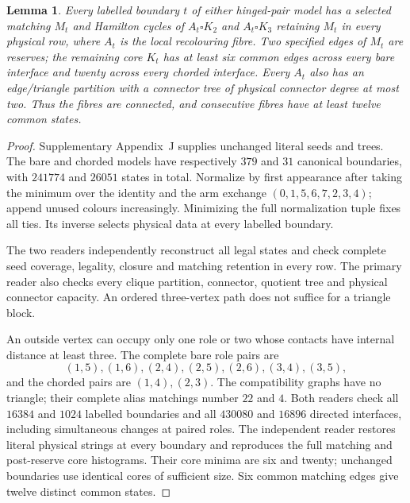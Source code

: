 \documentclass[11pt]{article}
\newtheorem{lemma}[theorem]{Lemma}
\theoremstyle{remark}
\numberwithin{equation}{section}
\numberwithin{table}{section}
\begin{document}
\begin{lemma}\label{lem:hinged-data}
Every labelled boundary $t$ of either hinged-pair model has a selected
matching $M_t$ and Hamilton cycles of $A_t\square K_2$ and
$A_t\square K_3$ retaining $M_t$ in every physical row, where $A_t$
is the local recolouring fibre. Two specified edges of $M_t$ are
reserves; the remaining core $K_t$ has at least six common edges
across every bare interface and twenty across every chorded interface.
Every $A_t$ also has an edge/triangle partition with a connector tree
of physical connector degree at most two. Thus the fibres are connected,
and consecutive fibres have at least twelve common states.
\end{lemma}
\begin{proof}
Supplementary Appendix~J supplies unchanged literal seeds and trees.
The bare and chorded models have respectively $379$ and $31$ canonical
boundaries, with $241774$ and $26051$ states in total. Normalize by
first appearance after taking the minimum over the identity and the
arm exchange $(0,1,5,6,7,2,3,4)$; append unused colours increasingly.
Minimizing the full normalization tuple fixes all ties. Its inverse
selects physical data at every labelled boundary.

The two readers independently reconstruct all legal states and check
complete seed coverage, legality, closure and matching retention in
every row. The primary reader also checks every clique partition,
connector, quotient tree and physical connector capacity. An ordered
three-vertex path does not suffice for a triangle block.

An outside vertex can occupy only one role or two whose contacts
have internal distance at least three. The complete bare role pairs are
\[
 (1,5),(1,6),(2,4),(2,5),(2,6),(3,4),(3,5),
\]
and the chorded pairs are $(1,4),(2,3)$. The compatibility graphs
have no triangle; their complete alias matchings number $22$ and $4$.
Both readers check all $16384$ and $1024$ labelled boundaries and
all $430080$ and $16896$ directed interfaces, including simultaneous
changes at paired roles. The independent reader restores literal
physical strings at every boundary and reproduces the full matching
and post-reserve core histograms. Their core minima are six and
twenty; unchanged boundaries use identical cores of sufficient size.
Six common matching edges give twelve distinct common states.
\end{proof}
\end{document}
